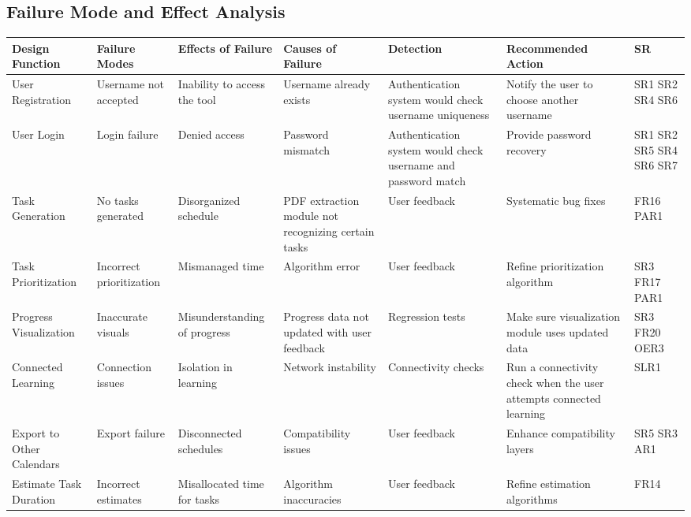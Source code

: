 \documentclass{article}
\begin{document}
\clearpage %
\begin{landscape}
    \pagestyle{empty}%

\section{Failure Mode and Effect Analysis}


\begin{longtable}{|p{2cm}|p{3cm}|p{3cm}|p{3cm}|p{3cm}|p{3cm}|p{2cm}|}
\hline
\textbf{Design Function} & \textbf{Failure Modes} & \textbf{Effects of Failure} & \textbf{Causes of Failure} & \textbf{Detection} & \textbf{Recommended Action} & \textbf{SR} \\
\hline
User Registration & Username not accepted & Inability to access the tool & Username already exists & Authentication system would check username uniqueness & Notify the user to choose another username & SR1 SR2 SR4 SR6 \\
\hline
User Login & Login failure & Denied access & Password mismatch & Authentication system would check username and password match & Provide password recovery & SR1 SR2 SR5 SR4 SR6 SR7 \\
\hline
Task Generation & No tasks generated & Disorganized schedule & PDF extraction module not recognizing certain tasks & User feedback & Systematic bug fixes & FR16 PAR1 \\
\hline
Task Prioritization & Incorrect prioritization & Mismanaged time & Algorithm error & User feedback & Refine prioritization algorithm & SR3 FR17 PAR1 \\
\hline
Progress Visualization & Inaccurate visuals & Misunderstanding of progress & Progress data not updated with user feedback & Regression tests & Make sure visualization module uses updated data & SR3 FR20 OER3 \\
\hline
Connected Learning & Connection issues & Isolation in learning & Network instability & Connectivity checks & Run a connectivity check when the user attempts connected learning & SLR1 \\
\hline
Export to Other Calendars & Export failure & Disconnected schedules & Compatibility issues & User feedback & Enhance compatibility layers & SR5 SR3 AR1 \\
\hline
Estimate Task Duration & Incorrect estimates & Misallocated time for tasks & Algorithm inaccuracies & User feedback & Refine estimation algorithms & FR14 \\
\hline
\end{longtable}
\end{landscape}
\pagestyle{plain}%
\clearpage %
\end{document}
